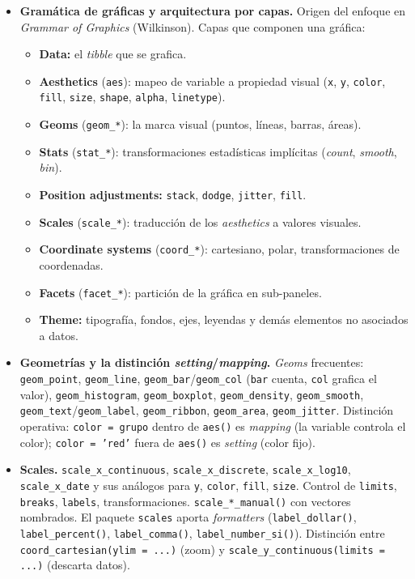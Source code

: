\documentclass[11pt,letterpaper]{article}
\begin{document}
\begin{itemize}[leftmargin=*, itemsep=2pt]
    \item \textbf{Gramática de gráficas y arquitectura por capas.} Origen del enfoque en \textit{Grammar of Graphics} (Wilkinson). Capas que componen una gráfica:
    \begin{itemize}[leftmargin=*, itemsep=1pt, label=$\circ$]
        \item \textbf{Data:} el \textit{tibble} que se grafica.
        \item \textbf{Aesthetics} (\texttt{aes}): mapeo de variable a propiedad visual (\texttt{x}, \texttt{y}, \texttt{color}, \texttt{fill}, \texttt{size}, \texttt{shape}, \texttt{alpha}, \texttt{linetype}).
        \item \textbf{Geoms} (\texttt{geom\_*}): la marca visual (puntos, líneas, barras, áreas).
        \item \textbf{Stats} (\texttt{stat\_*}): transformaciones estadísticas implícitas (\textit{count}, \textit{smooth}, \textit{bin}).
        \item \textbf{Position adjustments:} \texttt{stack}, \texttt{dodge}, \texttt{jitter}, \texttt{fill}.
        \item \textbf{Scales} (\texttt{scale\_*}): traducción de los \textit{aesthetics} a valores visuales.
        \item \textbf{Coordinate systems} (\texttt{coord\_*}): cartesiano, polar, transformaciones de coordenadas.
        \item \textbf{Facets} (\texttt{facet\_*}): partición de la gráfica en sub-paneles.
        \item \textbf{Theme:} tipografía, fondos, ejes, leyendas y demás elementos no asociados a datos.
    \end{itemize}
    \item \textbf{Geometrías y la distinción \textit{setting}/\textit{mapping}.} \textit{Geoms} frecuentes: \texttt{geom\_point}, \texttt{geom\_line}, \texttt{geom\_bar}/\texttt{geom\_col} (\texttt{bar} cuenta, \texttt{col} grafica el valor), \texttt{geom\_histogram}, \texttt{geom\_boxplot}, \texttt{geom\_density}, \texttt{geom\_smooth}, \texttt{geom\_text}/\texttt{geom\_label}, \texttt{geom\_ribbon}, \texttt{geom\_area}, \texttt{geom\_jitter}. Distinción operativa: \texttt{color = grupo} dentro de \texttt{aes()} es \textit{mapping} (la variable controla el color); \texttt{color = 'red'} fuera de \texttt{aes()} es \textit{setting} (color fijo).
    \item \textbf{Scales.} \texttt{scale\_x\_continuous}, \texttt{scale\_x\_discrete}, \texttt{scale\_x\_log10}, \texttt{scale\_x\_date} y sus análogos para \texttt{y}, \texttt{color}, \texttt{fill}, \texttt{size}. Control de \texttt{limits}, \texttt{breaks}, \texttt{labels}, transformaciones. \texttt{scale\_*\_manual()} con vectores nombrados. El paquete \texttt{scales} aporta \textit{formatters} (\texttt{label\_dollar()}, \texttt{label\_percent()}, \texttt{label\_comma()}, \texttt{label\_number\_si()}). Distinción entre \texttt{coord\_cartesian(ylim = ...)} (zoom) y \texttt{scale\_y\_continuous(limits = ...)} (descarta datos).

\end{itemize}
\end{document}
